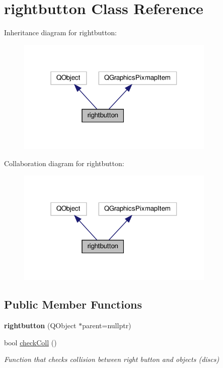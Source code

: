 \hypertarget{classrightbutton}{}\section{rightbutton Class Reference}
\label{classrightbutton}


Inheritance diagram for rightbutton\+:\nopagebreak
\begin{figure}[H]
\begin{center}
\leavevmode
\includegraphics[width=268pt]{classrightbutton__inherit__graph}
\end{center}
\end{figure}


Collaboration diagram for rightbutton\+:\nopagebreak
\begin{figure}[H]
\begin{center}
\leavevmode
\includegraphics[width=268pt]{classrightbutton__coll__graph}
\end{center}
\end{figure}
\subsection*{Public Member Functions}
\begin{DoxyCompactItemize}
\item 
\mbox{\label{classrightbutton_ae516758294d5cada4b99936e72aa9891}} 
{\bfseries rightbutton} (Q\+Object $\ast$parent=nullptr)
\item 
bool \hyperlink{classrightbutton_a50b7acc734df9c1e17e2acd718ba4ee9}{check\+Coll} ()
\begin{DoxyCompactList}\small\item\em Function that checks collision between right button and objects (discs) \end{DoxyCompactList}\end{DoxyCompactItemize}


